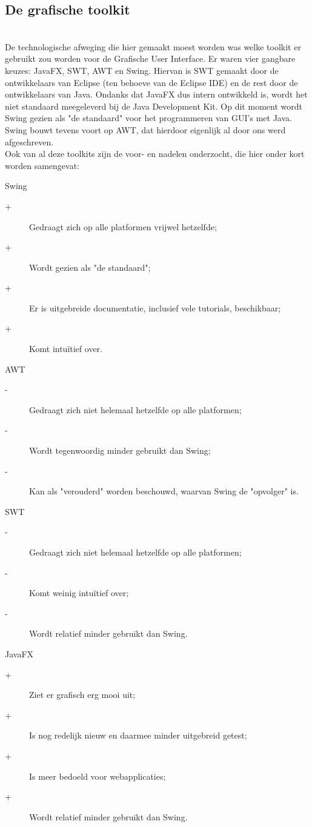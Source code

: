 \documentclass[a4paper,11pt]{article}
\begin{document}
\subsection{De grafische toolkit}\mbox{} \\
De technologische afweging die hier gemaakt moest worden was welke toolkit er gebruikt zou worden voor de Grafische User Interface. Er waren vier gangbare keuzes: JavaFX, SWT, AWT en Swing. Hiervan is SWT gemaakt door de ontwikkelaars van Eclipse (ten behoeve van de Eclipse IDE) en de rest door de ontwikkelaars van Java. Ondanks dat JavaFX dus intern ontwikkeld is, wordt het niet standaard meegeleverd bij de Java Development Kit. Op dit moment wordt Swing gezien als "de standaard" voor het programmeren van GUI's met Java. Swing bouwt tevens voort op AWT, dat hierdoor eigenlijk al door ons werd afgeschreven.\\

Ook van al deze toolkits zijn de voor- en nadelen onderzocht, die hier onder kort worden samengevat:\\
\begin{description}
	\item Swing
		\begin{description}
			\item[+] Gedraagt zich op alle platformen vrijwel hetzelfde;
			\item[+] Wordt gezien als "de standaard";
			\item[+] Er is uitgebreide documentatie, inclusief vele tutorials, beschikbaar;
			\item[+] Komt intuïtief over.
		\end{description}
	\item AWT
		\begin{description}
			\item[-] Gedraagt zich niet helemaal hetzelfde op alle platformen;
			\item[-] Wordt tegenwoordig minder gebruikt dan Swing;
			\item[-] Kan als "verouderd" worden beschouwd, waarvan Swing de "opvolger" is.
		\end{description}
	\item SWT
		\begin{description}
			\item[-] Gedraagt zich niet helemaal hetzelfde op alle platformen;
			\item[-] Komt weinig intuïtief over;
			\item[-] Wordt relatief minder gebruikt dan Swing.
		\end{description}
	\item JavaFX
		\begin{description}
			\item[+] Ziet er grafisch erg mooi uit;
			\item[+] Is nog redelijk nieuw en daarmee minder uitgebreid getest;
			\item[+] Is meer bedoeld voor webapplicaties;
			\item[+] Wordt relatief minder gebruikt dan Swing.
		\end{description}
\end{description}
\end{document}
